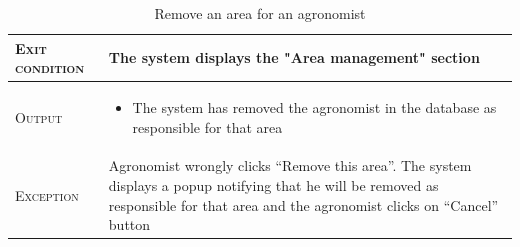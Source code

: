 \begin{table}[H]
\begin{tabular}[c]{|l|p{}|}
        \hline %
        \textsc{Exit condition}    &  The system displays the "Area management" section\\
    	\hline %
    	\textsc{Output}             &  \begin{itemize}
    	    \item The system has removed the agronomist in the database as responsible for that area
    	\end{itemize}\\
    	\hline %
    	\textsc{Exception}         &  Agronomist wrongly clicks “Remove this area”. The system displays a popup notifying that he will be removed as responsible for that area and the agronomist clicks on “Cancel” button\\
    	\hline %
        
    \end{tabular}
    \caption{\label{tab:responsible_area_insertion}Remove an area for an agronomist}
\end{table}


